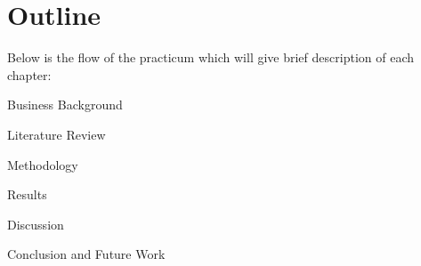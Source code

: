 \section{Outline}
Below is the flow of the practicum which will give brief description of each chapter:
\begin{list}
\item Business Background
\item Literature Review
\item Methodology
\item Results
\item Discussion
\item Conclusion and Future Work
\end{list}
